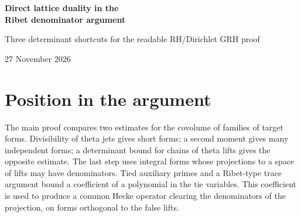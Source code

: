 \documentclass[11pt]{article}
\begin{document}
\begin{center}
{\LARGE\bfseries Direct lattice duality in the\\[3pt] Ribet denominator argument}\par
\vspace{7pt}
{\large Three determinant shortcuts for the readable RH/Dirichlet GRH proof}\par
\vspace{7pt}
27 November 2026
\end{center}
\begin{abstract}
The Alp\"oge--Claude proof bounds the denominator of a theta-lift projection by a first-order Ribet argument. Its linear algebra over a discrete valuation ring repeatedly enlarges relation modules, measures the cost of the enlargement by a relative length, and compares Fitting ideals. We give a single elementary-divisor framework for three replacements. First, the relative-length enlargement has a finite, explicit certificate of exactly the required valuation, without Noetherian induction on polynomial submodules. Second, the distinguished coefficient of the triangular Fitting ideal is obtained by one determinant of rows lifted from the constant-coefficient lattice; the loss from scalar torsion is the actual length of that torsion, not the full ambient dimension times its valuation. Third, the matrix-block relation bound follows directly from a row lattice and its annihilator, without an auxiliary modulus, determinant congruence or division by that modulus. All three recover the original Lean contracts, including the polynomial divisibility essential for first-order coefficient extraction. The results here are paper-level replacements with exact finite-model checks and an integration specification, not a new kernel-checked proof or measured whole-project reduction.
\end{abstract}

\section{Position in the argument}
The main proof compares two estimates for the covolume of families of target forms. Divisibility of theta jets gives short forms; a second moment gives many independent forms; a determinant bound for chains of theta lifts gives the opposite estimate. The last step uses integral forms whose projections to a space of lifts may have denominators. Tied auxiliary primes and a Ribet-type trace argument bound a coefficient of a polynomial in the tie variables. This coefficient is used to produce a common Hecke operator clearing the denominators of the projection, on forms orthogonal to the false lifts.
\end{document}
